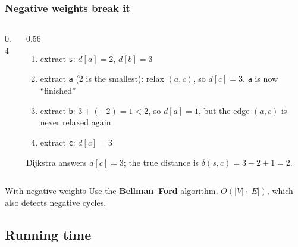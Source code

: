 \documentclass[aspectratio=169,10pt,compress]{beamer}
\begin{document}
\begin{frame}[t,fragile] \frametitle{Negative weights break it}
  \begin{columns}[T]
    \begin{column}{0.4\textwidth}
      \begin{center}
      \end{center}
    \end{column}
    \begin{column}{0.56\textwidth}
      \begin{enumerate}\small
        \item extract \texttt{s}: $d[a] = 2$, $d[b] = 3$
        \item extract \texttt{a} (2 is the smallest): relax $(a, c)$, so $d[c] = 3$.
              \texttt{a} is now ``finished''
        \item extract \texttt{b}: $3 + (-2) = 1 < 2$, so $d[a] = 1$, but the edge $(a, c)$
              is never relaxed again
        \item extract \texttt{c}: $d[c] = 3$
      \end{enumerate}
      \small Dijkstra answers $d[c] = 3$; the true distance is $\delta(s, c) = 3 - 2 + 1 = 2$.
    \end{column}
  \end{columns}

  \vspace{0.6em}
  \begin{block}{With negative weights}
    \small Use the \textbf{Bellman--Ford} algorithm, $O(|V| \cdot |E|)$, which also detects negative cycles.
  \end{block}
\end{frame}

\subsection[Complexity]{Running time}
\end{document}
